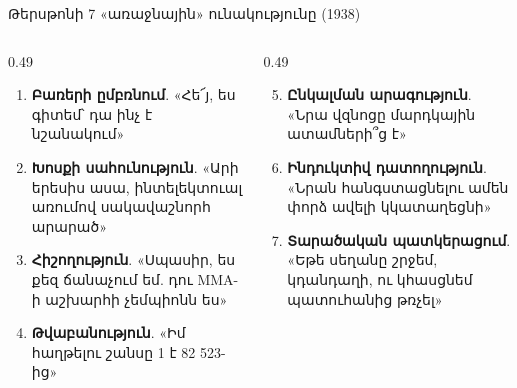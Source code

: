\begin{frame}{Թերսթոնի 7 «առաջնային» ունակությունը (1938)}
  \begin{columns}[T]
    \begin{column}{0.49\textwidth}
      \small
      \begin{enumerate}
        \item<2-> \textbf{Բառերի ըմբռնում}. «Հե՜յ, ես գիտեմ՝ դա ինչ է նշանակում»
        \item<3-> \textbf{Խոսքի սահունություն}. «Արի երեսիս ասա, ինտելեկտուալ առումով սակավաշնորհ արարած»
        \item<4-> \textbf{Հիշողություն}. «Սպասիր, ես քեզ ճանաչում եմ. դու MMA-ի աշխարհի չեմպիոնն ես»
        \item<5-> \textbf{Թվաբանություն}. «Իմ հաղթելու շանսը 1 է 82 523-ից»
      \end{enumerate}
    \end{column}
    \begin{column}{0.49\textwidth}
      \small
      \begin{enumerate}\setcounter{enumi}{4}
        \item<6-> \textbf{Ընկալման արագություն}. «Նրա վզնոցը մարդկային ատամների՞ց է»
        \item<7-> \textbf{Ինդուկտիվ դատողություն}. «Նրան հանգստացնելու ամեն փորձ ավելի կկատաղեցնի»
        \item<8-> \textbf{Տարածական պատկերացում}. «Եթե սեղանը շրջեմ, կդանդաղի, ու կհասցնեմ պատուհանից թռչել»
      \end{enumerate}
      \vspace{1mm}
    \end{column}
  \end{columns}
\end{frame}

